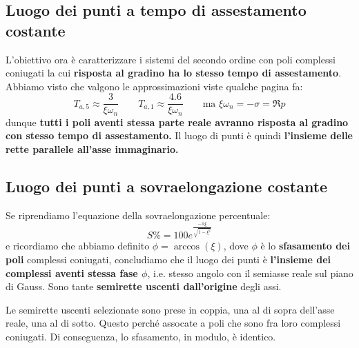 \subsection{Luogo dei punti a tempo di assestamento costante}
L'obiettivo ora è caratterizzare i sistemi del secondo ordine con poli complessi coniugati la cui \textbf{risposta al gradino ha lo stesso tempo di assestamento}. Abbiamo visto che valgono le approssimazioni viste qualche pagina fa:
\begin{equation*}
T_{a,5} \approx \frac{3}{\xi \omega_n} \quad \quad T_{a,1} \approx \frac{4.6}{\xi \omega_n} \quad \quad \textrm{ma } \xi\omega_n  = -\sigma = \Re{p}
\end{equation*}
dunque \textbf{tutti i poli aventi stessa parte reale avranno risposta al gradino con stesso tempo di assestamento.} Il luogo di punti è quindi \textbf{l'insieme delle rette parallele all'asse immaginario.}
\subsection{Luogo dei punti a sovraelongazione costante}
Se riprendiamo l'equazione della sovraelongazione percentuale:
\begin{equation*}
S\% = 100e^{\frac{-\pi\xi}{\sqrt{1-\xi^2}}}
\end{equation*}
e ricordiamo che abbiamo definito $\phi = \arccos(\xi)$, dove $\phi$ è lo \textbf{sfasamento dei poli} complessi coniugati, concludiamo che il luogo dei punti è \textbf{l'insieme dei complessi aventi stessa fase $\phi$}, i.e. stesso angolo con il semiasse reale sul piano di Gauss. Sono tante \textbf{semirette uscenti dall'origine} degli assi.

\bb
Le semirette uscenti selezionate sono prese in coppia, una al di sopra dell'asse reale, una al di sotto. Questo perché assocate a poli che sono fra loro complessi coniugati. Di conseguenza, lo sfasamento, in modulo, è identico.

